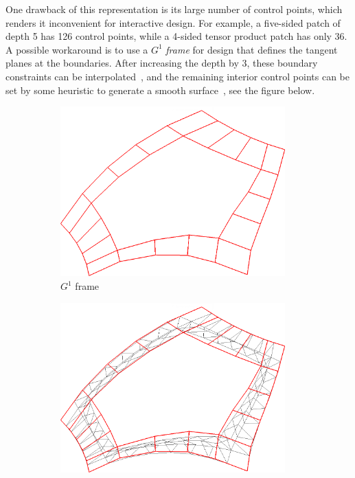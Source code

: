 \documentclass[9pt,academicons]{article}
\begin{document}
One drawback of this representation is its large number of control points, which renders it
inconvenient for interactive design. For example, a five-sided patch of depth 5 has 126 control
points, while a 4-sided tensor product patch has only 36. A possible workaround is to use a
$G^1$ \emph{frame} for design that defines the tangent planes at the boundaries.
After increasing the depth by 3, these boundary constraints can be interpolated~\cite{Loop:1990},
and the remaining interior control points can be set by some heuristic to generate a smooth
surface~\cite{Salvi:2019:KEPAF}, see the figure below.
\begin{figure}[h!]
  {
    \begin{subfigure}{0.3\textwidth}
      \centering
      \includegraphics[width = 0.95\textwidth]{images/5-5-bezier-ribbon.png}
      \caption{$G^1$ frame}
      \label{fig:spatch-ribbon}
    \end{subfigure}
    \hfill
    \begin{subfigure}{0.3\textwidth}
      \centering
      \includegraphics[width = 0.95\textwidth]{images/5-5-cnet-ribbon.png}

\end{subfigure}}
\end{figure}
\end{document}
